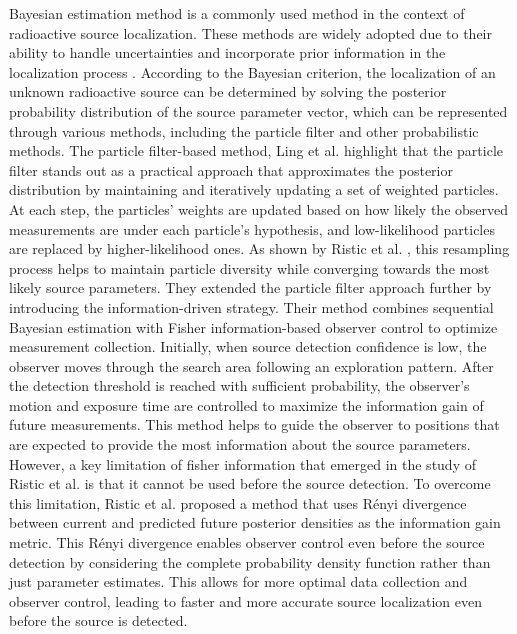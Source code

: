 \documentclass[../report.tex]{subfiles}
\begin{document}
    Bayesian estimation method is a commonly used method in the context of radioactive source localization. These methods are widely adopted due to their ability to handle uncertainties and incorporate
    prior information in the localization process \cite{hu2024autonomous}. According to the Bayesian criterion, the localization of an unknown radioactive source can be determined by solving the posterior probability distribution
    of the source parameter vector, which can be represented through various methods, including the particle filter \cite{Ristic2007AnIG} \cite{ristic2010information} \cite{ling2022multi} and other probabilistic methods. The particle filter-based method, 
    Ling et al. \cite{ling2022multi} highlight that the particle filter stands out as a practical approach that approximates the posterior distribution by maintaining and iteratively updating a set of weighted
    particles. At each step, the particles' weights are updated based on how likely the observed measurements are under each particle's hypothesis, and low-likelihood particles are replaced by higher-likelihood ones. 
    As shown by Ristic et al. \cite{Ristic2007AnIG}, this resampling process helps to maintain particle diversity while converging towards the most likely source parameters. They extended the 
    particle filter approach further by introducing the information-driven strategy. Their method combines sequential Bayesian estimation with Fisher information-based observer control to optimize measurement
    collection. Initially, when source detection confidence is low, the observer moves through the search area following an exploration pattern. After the detection threshold is reached with sufficient
    probability, the observer's motion and exposure time are controlled to maximize the information gain of future measurements. This method helps to guide the observer to positions that are expected
    to provide the most information about the source parameters. However, a key limitation of fisher information that emerged in the study of Ristic et al. \cite{ristic2010information} is that it 
    cannot be used before the source detection. To overcome this limitation, Ristic et al. proposed a method that uses Rényi divergence between current and predicted future posterior densities as 
    the information gain metric. This Rényi divergence enables observer control even before the source detection by considering the complete probability density function rather than just parameter estimates.
    This allows for more optimal data collection and observer control, leading to faster and more accurate source localization even before the source is detected. 
\end{document}
